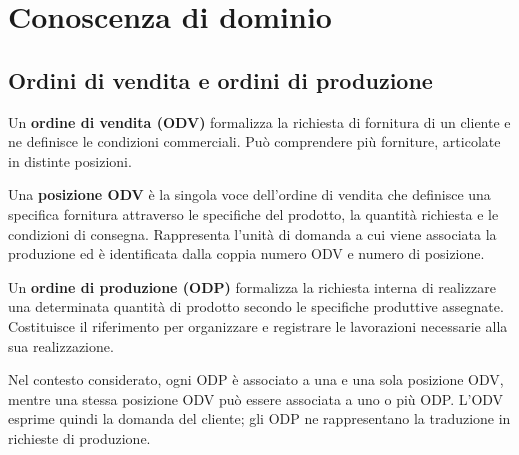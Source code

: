 \section{Conoscenza di dominio}
\label{sec:domain-knowledge}

\subsection{Ordini di vendita e ordini di produzione}
\label{sec:odv-odp}

Un \textbf{ordine di vendita (ODV)} formalizza la richiesta di fornitura di un cliente e ne definisce le condizioni commerciali. Può comprendere più forniture, articolate in distinte posizioni.

Una \textbf{posizione ODV} è la singola voce dell'ordine di vendita che definisce una specifica fornitura attraverso le specifiche del prodotto, la quantità richiesta e le condizioni di consegna. Rappresenta l'unità di domanda a cui viene associata la produzione ed è identificata dalla coppia numero ODV e numero di posizione.

Un \textbf{ordine di produzione (ODP)} formalizza la richiesta interna di realizzare una determinata quantità di prodotto secondo le specifiche produttive assegnate. Costituisce il riferimento per organizzare e registrare le lavorazioni necessarie alla sua realizzazione.

Nel contesto considerato, ogni ODP è associato a una e una sola posizione ODV, mentre una stessa posizione ODV può essere associata a uno o più ODP. L'ODV esprime quindi la domanda del cliente; gli ODP ne rappresentano la traduzione in richieste di produzione.

